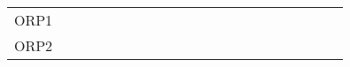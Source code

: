 \begin{tabular}{lllllllllllllllllllll}
	ORP1 &  & \cellcolor{emblgreen!75} & \cellcolor{emblgreen!75} & \cellcolor{emblgreen!75} & \cellcolor{emblgreen!75} & \cellcolor{emblgreen!75} & \cellcolor{emblgreen!75} & \cellcolor{emblgreen!75} & \cellcolor{emblgreen!75} &  & \cellcolor{emblgreen!75} & \cellcolor{emblgreen!75} &  & \cellcolor{emblgreen!75} &  &  & \cellcolor{emblgreen!75} &  & \cellcolor{emblyellow!75} & \\
	ORP2 & \cellcolor{emblgreen!75} & \cellcolor{emblgreen!75} &  & \cellcolor{emblgreen!75} & \cellcolor{emblgreen!75} & \cellcolor{emblgreen!75} & \cellcolor{emblgreen!75} & \cellcolor{emblgreen!75} & \cellcolor{emblgreen!75} & \cellcolor{emblgreen!75} & \cellcolor{emblgreen!75} & \cellcolor{emblgreen!75} &  & \cellcolor{emblgreen!75} &  &  &  & \cellcolor{emblgreen!75} & \cellcolor{emblgreen!75} & \\
\end{tabular}
\quad
